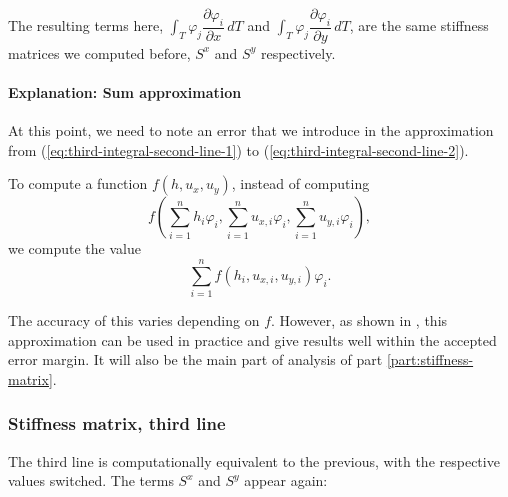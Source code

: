 \documentclass[a4paper, twoside]{article}
\newcommand{\pd}[2]{\dfrac{\partial #1}{\partial #2}}
\renewcommand{\phi}{\varphi}
\begin{document}
The resulting terms here, $\int_T \phi_j \pd{\phi_i}{x} \, dT$ and $\int_T \phi_j \pd{\phi_i}{y} \, dT$, are the same stiffness matrices we computed before, $S^x$ and $S^y$ respectively.

\paragraph{Explanation: Sum approximation}
\label{par:sum-approx}

At this point, we need to note an error that we introduce in the approximation from (\ref{eq:third-integral-second-line-1}) to (\ref{eq:third-integral-second-line-2}).

To compute a function $f(h, u_x, u_y)$, instead of computing
\begin{equation*}
  f\left(\sum_{i=1}^n h_i \phi_i,
    \sum_{i=1}^n u_{x,i} \phi_i,
    \sum_{i=1}^n u_{y,i} \phi_i\right),
\end{equation*}
we compute the value
\begin{equation*}
  \sum_{i=1}^n f(h_i,u_{x,i},u_{y,i}) \phi_i.
\end{equation*}

The accuracy of this varies depending on $f$. However, as shown in \cite{cockburn1999discontinuous}, this approximation can be used in practice and give results well within the accepted error margin. It will also be the main part of analysis of part \ref{part:stiffness-matrix}.

\subsubsection{Stiffness matrix, third line}

The third line is computationally equivalent to the previous, with the respective values switched. The terms $S^x$ and $S^y$ appear again:
\end{document}
